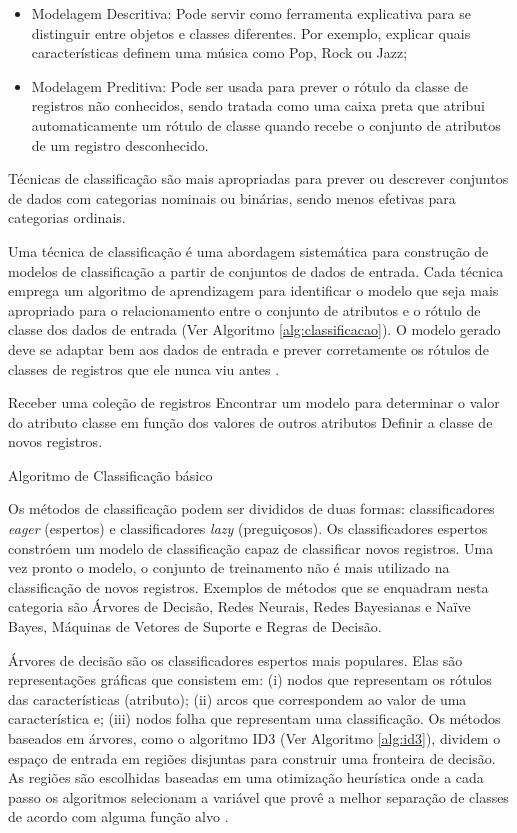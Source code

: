 \begin{itemize}
    \item Modelagem Descritiva: Pode servir como ferramenta explicativa para se distinguir entre objetos e classes diferentes. Por exemplo, explicar quais características definem uma música como Pop, Rock ou Jazz;
    
    \item Modelagem Preditiva: Pode ser usada para prever o rótulo da classe de registros não conhecidos, sendo tratada como uma caixa preta que atribui automaticamente um rótulo de classe quando recebe o conjunto de atributos de um registro desconhecido.
\end{itemize}

Técnicas de classificação são mais apropriadas para prever ou descrever conjuntos de dados com categorias nominais ou binárias, sendo menos efetivas para categorias ordinais.

Uma técnica de classificação é uma abordagem sistemática para construção de modelos de classificação a partir de conjuntos de dados de entrada. Cada técnica emprega um algoritmo de aprendizagem para identificar o modelo que seja mais apropriado para o relacionamento entre o conjunto de atributos e o rótulo de classe dos dados de entrada (Ver Algoritmo \ref{alg:classificacao}). O modelo gerado deve se adaptar bem aos dados de entrada e prever corretamente os rótulos de classes de registros que ele nunca viu antes \cite{pang2009}.

\begin{algorithm}[!htb]
    \SetAlgoLined
    Receber uma coleção de registros\;
    Encontrar um modelo  para determinar o valor do atributo classe em função dos valores de outros atributos\;
    Definir a classe de novos registros.
\caption{Algoritmo de Classificação básico}
\label{alg:classificacao}
\end{algorithm}

Os métodos de classificação podem ser divididos de duas formas: classificadores \textit{eager} (espertos) e classificadores \textit{lazy} (preguiçosos). Os classificadores espertos constróem um modelo de classificação capaz de classificar novos registros. Uma vez pronto o modelo, o conjunto de treinamento não é mais utilizado na classificação de novos registros. Exemplos de métodos que se enquadram nesta categoria são Árvores de Decisão, Redes Neurais, Redes Bayesianas e Naïve Bayes, Máquinas de Vetores de Suporte e Regras de Decisão.

Árvores de decisão são os classificadores espertos mais populares. Elas são representações gráficas que consistem em: (i) nodos que representam os rótulos das características (atributo); (ii) arcos que correspondem ao valor de uma característica e; (iii) nodos folha que representam uma classificação. Os métodos baseados em árvores, como o algoritmo ID3 (Ver Algoritmo \ref{alg:id3}), dividem o espaço de entrada em regiões disjuntas para construir uma fronteira de decisão. As regiões são escolhidas baseadas em uma otimização heurística onde a cada passo os algoritmos selecionam a variável que provê a melhor separação de classes de acordo com alguma função alvo \cite{vania2018-3}.
        

